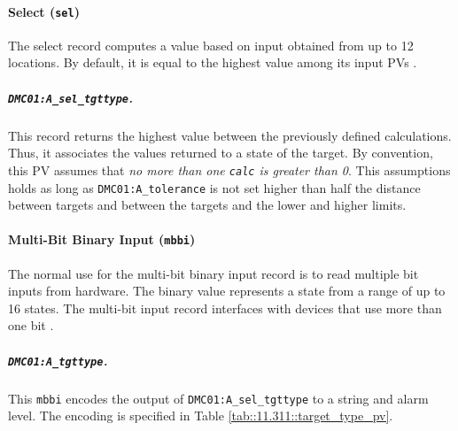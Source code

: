 \paragraph{Select (\texttt{sel})}
    The select record computes a value based on input obtained from up to 12 locations.
    By default, it is equal to the highest value among its input PVs \cite{stanley1998}.

    \subparagraph{\texttt{DMC01:A\_sel\_tgttype}.}
        This record returns the highest value between the previously defined calculations.
        Thus, it associates the values returned to a state of the target.
        By convention, this PV assumes that \emph{no more than one \texttt{calc} is greater than 0}.
        This assumptions holds as long as \texttt{DMC01:A\_tolerance} is not set higher than half the distance between targets and between the targets and the lower and higher limits.

\paragraph{Multi-Bit Binary Input (\texttt{mbbi})}
    The normal use for the multi-bit binary input record is to read multiple bit inputs from hardware.
    The binary value represents a state from a range of up to 16 states.
    The multi-bit input record interfaces with devices that use more than one bit \cite{stanley1998}.

    \subparagraph{\texttt{DMC01:A\_tgttype}.}
        This \texttt{mbbi} encodes the output of \texttt{DMC01:A\_sel\_tgttype} to a string and alarm level.
        The encoding is specified in Table \ref{tab::11.311::target_type_pv}.

